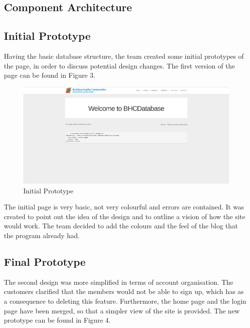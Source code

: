 \documentclass{l3proj}
\begin{document}
\subsection{Component Architecture}
\label{sec:component}




\subsection{Initial Prototype}
\label{sec:prototype1}

Having the basic database structure, the team created some initial prototypes of the page, in order to discuss potential design changes. The first version of the page can be found in Figure 3.

\begin{figure}
  \centerline{\includegraphics[width=\textwidth, height=\textheight, keepaspectratio]{oldhome.png}}
  \caption{Initial Prototype}
\end{figure}

The initial page is very basic, not very colourful and errors are contained. It was created to point out the idea of the  design and to outline a vision of how the site would work. The team decided to add the colours and the feel of the blog that the program already had.

\subsection{Final Prototype}
\label{sec:prototype2} 

The second design was more simplified in terms of account organisation. The customers clarified that the members would not be able to sign up, which has as a consequence to deleting this feature. Furthermore, the home page and the login page have been merged, so that a simpler view of the site is provided. The new prototype can be found in Figure 4.
\end{document}
